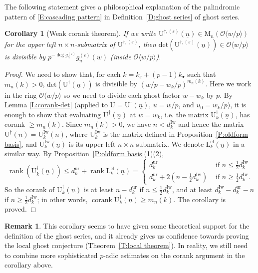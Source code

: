 \documentclass[12pt]{amsart}
\newtheorem{corollary}[subsection]{Corollary}
\theoremstyle{definition}
\newtheorem{remark}[subsection]{Remark}
\numberwithin{equation}{subsection}
\def\calO{\mathcal{O}}
\def\rmL{\mathrm{L}}
\def\rmM{\mathrm{M}}
\def\rmU{\mathrm{U}}
\DeclareMathOperator{\rank}{rank}
\newcommand{\Iw}{\mathrm{Iw}}
\renewcommand{\det}{\mathrm{det}}
\DeclareMathOperator{\corank}{corank}
\newcommand{\cl}{\mathrm{cl}}
\newcommand{\ur}{\mathrm{ur}}
\begin{document}
The following statement gives a philosophical explanation of the palindromic pattern of \eqref{E:cascading pattern} in Definition~\ref{D:ghost series} of ghost series.
\begin{corollary}[Weak corank theorem]
\label{C:philosophical explanation of ghost series}
If we write $\rmU^{\dagger, (\varepsilon)}(\underline n) \in \rmM_n(\calO\langle w/p\rangle)$ for the upper left $n\times n$-submatrix of $\rmU^{\dagger, (\varepsilon)}$, then
$\det( \rmU^{\dagger,(\varepsilon)}(\underline n)) \in \calO\langle w/p\rangle$ is divisible by $p^{-\deg g_n^{(\varepsilon)}} g_n^{(\varepsilon)}(w)$ (inside $\calO\langle w/p\rangle$).
\end{corollary}
\begin{proof}
We need to show that, for each ${k} = k_\varepsilon + (p-1)k_{\bullet}$ such that $m_n(k) >0$,  $\det(\rmU^\dagger(\underline n))$ is divisible by $(w/p -  {w_k}/p)^{m_n(k)}$. Here we work in the ring $\calO\langle w/p\rangle$ so we need to divide each ghost factor $w-w_k$ by $p$.
By Lemma \ref{L:corank-det} (applied to $\rmU = \rmU^\dagger(\underline n)$, $u = w/p$, and $u_0 = w_k/p)$, it is enough to show that evaluating $\rmU^\dagger(\underline n)$ at $w= w_k$, i.e. the matrix $\rmU_k^\dagger(\underline n)$, has corank $\geq m_n(k)$. Since $m_n(k)>0$, we have $n<d_k^\Iw$ and hence the matrix $\rmU^\dagger(\underline n)=\rmU_k^\Iw(\underline n)$, where $\rmU_k^\Iw$ is the matrix defined in Proposition~\ref{P:oldform basis}, and $\rmU_k^\Iw(\underline n)$ is its upper left $n\times n$-submatrix. We denote
$\rmL^\cl_k(\underline n)$ in a similar way. By Proposition~\ref{P:oldform basis}(1)(2), 
$$
\rank (\rmU^\dagger_k(\underline n)) \leq d_k^\ur+\rank \rmL^\cl_k(\underline n)= \begin{cases}
d_k^\ur & \textrm{ if } n \leq \frac 12d_k^\Iw\\
d_k^\ur+2(n-\frac 12 d_k^\Iw)  & \textrm{ if }n \geq \frac 12 d_k^\Iw.
\end{cases}
$$
So the corank of $\rmU^\dagger_k(\underline n)$ is at least $n -d_k^\ur$ if $n \leq \frac 12 d_k^\Iw$, and at least $d_k^\Iw - d_k^\ur - n$ if $n \geq \frac 12 d_k^\Iw$; in other words, $\corank \rmU^\dagger_k(\underline n)\geq m_n(k)$. The corollary is proved.
\end{proof}

\begin{remark}
This corollary seems to have given some theoretical support for the definition of the ghost series, and it already gives us confidence towards proving the local ghost conjecture (Theorem~\ref{T:local theorem}). In reality, we still need to combine more sophisticated $p$-adic estimates on the corank argument in the corollary above.
\end{remark}
\end{document}
